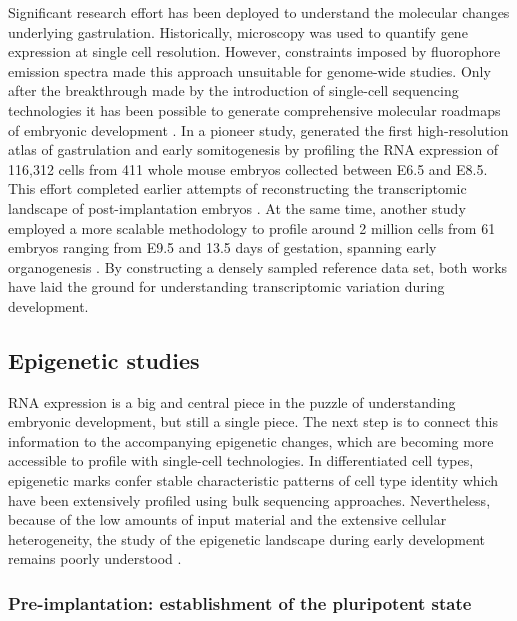 Significant research effort has been deployed to understand the molecular changes underlying gastrulation. Historically, microscopy was used to quantify gene expression at single cell resolution. However, constraints imposed by fluorophore emission spectra made this approach unsuitable for genome-wide studies. Only after the breakthrough made by the introduction of single-cell sequencing technologies it has been possible to generate comprehensive molecular roadmaps of embryonic development \cite{Schaum2018,PijuanSala2019,Cao2019,Aviv2017}. In a pioneer study, \cite{PijuanSala2019} generated the first high-resolution atlas of gastrulation and early somitogenesis by profiling the RNA expression of 116,312 cells from 411 whole mouse embryos collected between E6.5 and E8.5. This effort completed earlier attempts of reconstructing the transcriptomic landscape of post-implantation embryos \cite{Mohammed2017,Scialdone2016,Ibarra-Soria2018,Wen2017}. At the same time, another study employed a more scalable methodology  to profile around 2 million cells from 61 embryos ranging from E9.5 and 13.5 days of gestation, spanning early organogenesis \cite{Cao2019}. By constructing a densely sampled reference data set, both works have laid the ground for understanding transcriptomic variation during development. 


\subsection{Epigenetic studies}

RNA expression is a big and central piece in the puzzle of understanding embryonic development, but still a single piece. The next step is to connect this information to the accompanying epigenetic changes, which are becoming more accessible to profile with single-cell technologies. In differentiated cell types, epigenetic marks confer stable characteristic patterns of cell type identity which have been extensively profiled using bulk sequencing approaches. Nevertheless, because of the low amounts of input material and the extensive cellular heterogeneity, the study of the epigenetic landscape during early development remains poorly understood \cite{Kelsey2017}.

\subsubsection{Pre-implantation: establishment of the pluripotent state}

